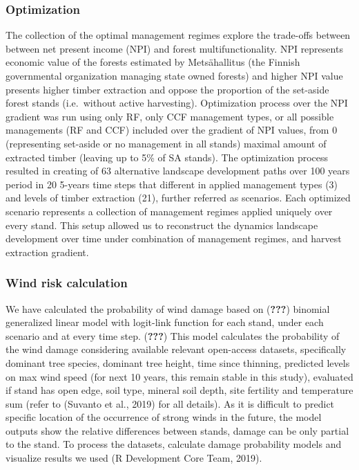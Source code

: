 \documentclass[]{elsarticle} %
\begin{document}
\subsubsection{Optimization}\label{optimization}

The collection of the optimal management regimes explore the trade-offs
between between net present income (NPI) and forest multifunctionality.
NPI represents economic value of the forests estimated by Metsähallitus
(the Finnish governmental organization managing state owned forests) and
higher NPI value presents higher timber extraction and oppose the
proportion of the set-aside forest stands (i.e.~without active
harvesting). Optimization process over the NPI gradient was run using
only RF, only CCF management types, or all possible managements (RF and
CCF) included over the gradient of NPI values, from 0 (representing
set-aside or no management in all stands) maximal amount of extracted
timber (leaving up to 5\% of SA stands). The optimization process
resulted in creating of 63 alternative landscape development paths over
100 years period in 20 5-years time steps that different in applied
management types (3) and levels of timber extraction (21), further
referred as scenarios. Each optimized scenario represents a collection
of management regimes applied uniquely over every stand. This setup
allowed us to reconstruct the dynamics landscape development over time
under combination of management regimes, and harvest extraction
gradient.

\subsubsection{Wind risk calculation}\label{wind-risk-calculation}

We have calculated the probability of wind damage based on
({\textbf{???}}) binomial generalized linear model with logit-link
function for each stand, under each scenario and at every time step.
({\textbf{???}}) This model calculates the probability of the wind
damage considering available relevant open-access datasets, specifically
dominant tree species, dominant tree height, time since thinning,
predicted levels on max wind speed (for next 10 years, this remain
stable in this study), evaluated if stand has open edge, soil type,
mineral soil depth, site fertility and temperature sum (refer to
(Suvanto et al., 2019) for all details). As it is difficult to predict
specific location of the occurrence of strong winds in the future, the
model outputs show the relative differences between stands, damage can
be only partial to the stand. To process the datasets, calculate damage
probability models and visualize results we used (R Development Core
Team, 2019).
\end{document}
